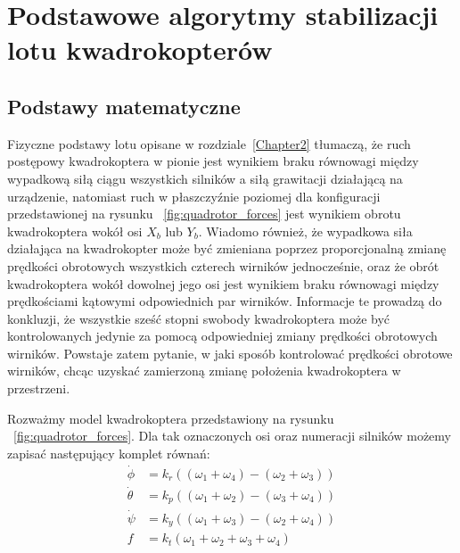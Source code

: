 


\chapter{Podstawowe algorytmy stabilizacji lotu kwadrokopterów} %

\label{Chapter3} %



\section{Podstawy matematyczne}

Fizyczne podstawy lotu opisane w rozdziale~\ref{Chapter2} tłumaczą, że ruch postępowy kwadrokoptera w pionie jest wynikiem braku równowagi między wypadkową siłą ciągu wszystkich silników a siłą grawitacji działającą na urządzenie, natomiast ruch w płaszczyźnie poziomej dla konfiguracji przedstawionej na rysunku ~\ref{fig:quadrotor_forces} jest wynikiem obrotu kwadrokoptera wokół osi $X_b$ lub $Y_b$. Wiadomo również, że wypadkowa siła działająca na kwadrokopter może być zmieniana poprzez proporcjonalną zmianę prędkości obrotowych wszystkich czterech wirników jednocześnie, oraz że obrót kwadrokoptera wokół dowolnej jego osi jest wynikiem braku równowagi między prędkościami kątowymi odpowiednich par wirników. Informacje te prowadzą do konkluzji, że wszystkie sześć stopni swobody kwadrokoptera może być kontrolowanych jedynie za pomocą odpowiedniej zmiany prędkości obrotowych wirników. Powstaje zatem pytanie, w jaki sposób kontrolować prędkości obrotowe wirników, chcąc uzyskać zamierzoną zmianę położenia kwadrokoptera w przestrzeni. 

Rozważmy model kwadrokoptera przedstawiony na rysunku ~\ref{fig:quadrotor_forces}. Dla tak oznaczonych osi oraz numeracji silników możemy zapisać następujący komplet równań:
\begin{equation}
\begin{aligned}
	\dot{\phi} &= k_r((\omega_1 + \omega_4) - (\omega_2 + \omega_3)) \\
	\dot{\theta} &= k_p((\omega_1 + \omega_2) - (\omega_3 + \omega_4)) \\
	\dot{\psi} &= k_y((\omega_1 + \omega_3) - (\omega_2 + \omega_4)) \\
	f &= k_t(\omega_1 + \omega_2 + \omega_3 + \omega_4)
\end{aligned}
\end{equation}

